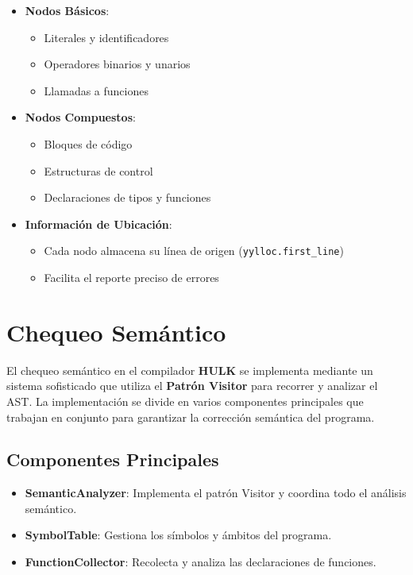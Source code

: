 \documentclass[11pt, a4paper, twoside]{article} %
\begin{document}
\begin{itemize}
    \item \textbf{Nodos Básicos}:
    \begin{itemize}
        \item Literales y identificadores
        \item Operadores binarios y unarios
        \item Llamadas a funciones
    \end{itemize}

    \item \textbf{Nodos Compuestos}:
    \begin{itemize}
        \item Bloques de código
        \item Estructuras de control
        \item Declaraciones de tipos y funciones
    \end{itemize}

    \item \textbf{Información de Ubicación}:
    \begin{itemize}
        \item Cada nodo almacena su línea de origen (\texttt{yylloc.first\_line})
        \item Facilita el reporte preciso de errores
    \end{itemize}
\end{itemize}


\section{Chequeo Sem\'antico}
El chequeo sem\'antico en el compilador \textbf{HULK} se implementa mediante un sistema sofisticado que utiliza el \textbf{Patr\'on Visitor} para recorrer y analizar el AST. La implementación se divide en varios componentes principales que trabajan en conjunto para garantizar la corrección semántica del programa.

\subsection{Componentes Principales}

\begin{itemize}
    \item \textbf{SemanticAnalyzer}: Implementa el patrón Visitor y coordina todo el análisis semántico.
    \item \textbf{SymbolTable}: Gestiona los símbolos y ámbitos del programa.
    \item \textbf{FunctionCollector}: Recolecta y analiza las declaraciones de funciones.
\end{itemize}
\end{document}
